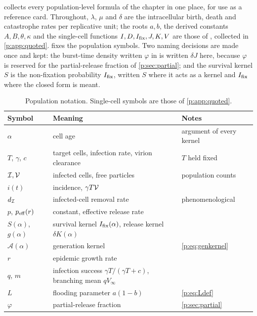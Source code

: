  collects every population-level formula of the
chapter in one place, for use as a reference card.
Throughout, $\lambda$, $\mu$ and $\delta$ are the intracellular birth, death
and catastrophe rates per replicative unit; the roots $a,b$, the derived
constants $A,B,\theta,\kappa$ and the single-cell functions
$I,D,I_{\mathrm{fix}},J,K,V$ are those of \ChCore{}, collected in
\cref{p:app:quoted}.  fixes the population symbols. Two
naming decisions are made once and kept: the burst-time density written
$\varphi$ in \ChDist{} is written $\delta J$ here, because $\varphi$ is
reserved for the partial-release fraction of \cref{p:sec:partial}; and the
survival kernel $S$ is the non-fixation probability $I_{\mathrm{fix}}$, written $S$
where it acts as a kernel and $I_{\mathrm{fix}}$ where the closed form is meant.

\begin{table}[htbp]
\centering
\renewcommand{\arraystretch}{1.12}
\small
\begin{tabular}{@{}lp{}p{}@{}}
\toprule
Symbol & Meaning & Notes \\
\midrule
$\alpha$ & cell age & argument of every kernel \\
$T$, $\gamma$, $c$ & target cells, infection rate, virion clearance & $T$ held fixed \\
$\mathcal{I},\mathcal{V}$ & infected cells, free particles & population counts \\
$i(t)$ & incidence, $\gamma T\mathcal{V}$ & \\
$d_{\mathcal{I}}$ & infected-cell removal rate & phenomenological \\
$p$, $p_{\rm eff}(r)$ & constant, effective release rate & \\
$S(\alpha)$, $g(\alpha)$ & survival kernel $I_{\mathrm{fix}}(\alpha)$, release kernel $\delta K(\alpha)$ & \\
$\mathcal A(\alpha)$ & generation kernel & \cref{p:eq:genkernel} \\
$r$ & epidemic growth rate & \\
$q$, $m$ & infection success $\gamma T/(\gamma T+c)$, branching mean $qV_\infty$ & \\
$L$ & flooding parameter $a(1-b)$ & \cref{p:eq:Ldef} \\
$\varphi$ & partial-release fraction & \cref{p:sec:partial} \\
\bottomrule
\end{tabular}
\caption{Population notation. Single-cell symbols are those of
\cref{p:app:quoted}.}
\label{p:tab:notation}
\end{table}

